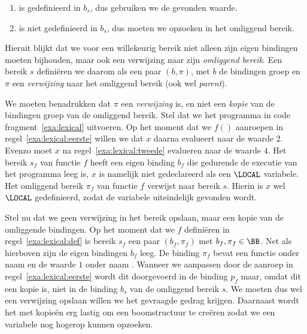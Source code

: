 \begin{enumerate}
  \item {} is gedefinieerd in $b_s$, dus gebruiken we de gevonden waarde.
  \item {} is niet gedefinieerd in $b_s$, dus moeten we  opzoeken in het omliggend bereik.
\end{enumerate}

Hieruit blijkt dat we voor een willekeurig bereik niet alleen zijn eigen bindingen moeten bijhouden, maar ook een verwijzing naar zijn \emph{omliggend bereik}. Een bereik $s$ definiëren we daarom als een paar $(b, \pi)$, met $b$ de bindingen groep en $\pi$ een \emph{verwijzing} naar het omliggend bereik (ook wel \emph{parent}).

We moeten benadrukken dat $\pi$ een \emph{verwijzing} is, en niet een \emph{kopie} van de bindingen groep van de omliggend bereik. Stel dat we het programma in code fragment~\ref{exa:lexical} uitvoeren. Op het moment dat we $f()$ aanroepen in regel~\ref{exa:lexical:eerste} willen we dat $x$ daarna evalueert naar de waarde $2$. Evenzo moet $x$ na regel~\ref{exa:lexical:tweede} evalueren naar de waarde $4$. Het bereik $s_f$ van functie $f$ heeft een eigen binding $b_f$ die gedurende de executie van het programma leeg is, $x$ is namelijk niet gedeclareerd als een $\LOCAL$ variabele. Het omliggend bereik $\pi_f$ van functie $f$ verwijst naar bereik $s$. Hierin is $x$ wel $\LOCAL$ gedefinieerd, zodat de variabele uiteindelijk gevonden wordt.

\begin{NoBreak}
  \codeFragmentCaption
\end{NoBreak}

Stel nu dat we geen verwijzing in het bereik opslaan, maar een kopie van de omliggende bindingen. Op het moment dat we $f$ definiëren in regel~\ref{exa:lexical:def} is bereik $s_f$ een paar $(b_f, \pi_f)$ met $b_f, \pi_f \in \BB$. Net als hierboven zijn de eigen bindingen $b_f$ leeg. De binding $\pi_f$ bevat een functie onder naam  en de waarde $1$ onder naam . Wanneer we  aanpassen door de aanroep in regel~\ref{exa:lexical:eerste} wordt dit doorgevoerd in de binding $p_f$ maar, omdat dit een kopie is, niet in de binding $b_s$ van de omliggend bereik $s$. We moeten dus wel een verwijzing opslaan willen we het gevraagde gedrag krijgen. Daarnaast wordt het met kopieën erg lastig om een boomstructuur te creëren zodat we een variabele nog hogerop kunnen opzoeken.

